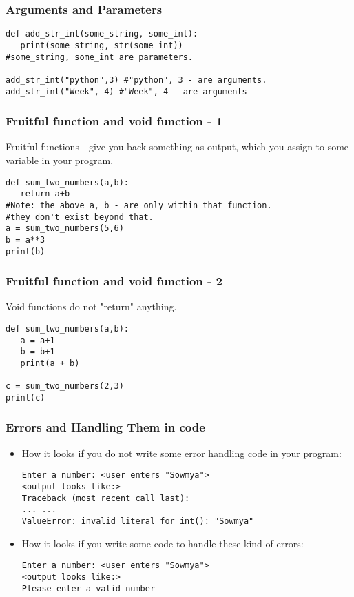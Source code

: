 \documentclass{beamer}
\begin{document}
\begin{frame}[fragile]
\frametitle{Arguments and Parameters}
\begin{verbatim}
def add_str_int(some_string, some_int):
   print(some_string, str(some_int))
#some_string, some_int are parameters.

add_str_int("python",3) #"python", 3 - are arguments. 
add_str_int("Week", 4) #"Week", 4 - are arguments
\end{verbatim}
\end{frame}

\begin{frame}[fragile]
\frametitle{Fruitful function and void function - 1}
Fruitful functions - give you back something as output, which you assign to some variable in your program.
\small
\begin{verbatim}
def sum_two_numbers(a,b):
   return a+b
#Note: the above a, b - are only within that function. 
#they don't exist beyond that. 
a = sum_two_numbers(5,6) 
b = a**3
print(b)
\end{verbatim}
\end{frame}

\begin{frame}[fragile]
\frametitle{Fruitful function and void function - 2}
Void functions do not "return" anything. 
\begin{verbatim}
def sum_two_numbers(a,b):
   a = a+1
   b = b+1
   print(a + b)

c = sum_two_numbers(2,3)
print(c)
\end{verbatim}
\end{frame}

\begin{frame}[fragile]
\frametitle{Errors and Handling Them in code}
\begin{itemize}
\item How it looks if you do not write some error handling code in your program:
\begin{verbatim}
Enter a number: <user enters "Sowmya">
<output looks like:>
Traceback (most recent call last):
... ... 
ValueError: invalid literal for int(): "Sowmya"
\end{verbatim}
\item How it looks if you write some code to handle these kind of errors:
\begin{verbatim}
Enter a number: <user enters "Sowmya">
<output looks like:>
Please enter a valid number
\end{verbatim}
\end{itemize}
\end{frame}
\end{document}
